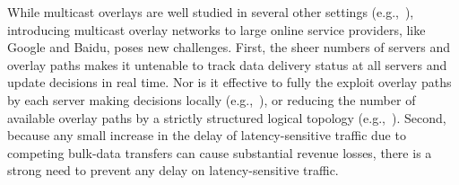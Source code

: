 While multicast overlays are well studied in several other settings
(e.g.,~\cite{Liebeherr2002Application,Wang2007mTreebone,Andreev2013Designing,Mokhtarian2015Minimum}), introducing multicast overlay networks
to large online  service providers,
like Google and Baidu, poses new challenges.
First, the sheer numbers of servers and overlay paths makes
it untenable to track data delivery status at all servers and
update decisions in real time.
Nor is it effective to fully the exploit
overlay paths by each server making decisions locally
(e.g.,~\cite{kostic2003bullet,Repantis2010Scaling}),
or reducing the number of available overlay paths by a
strictly structured logical topology
(e.g.,~\cite{Nygren2010The}).
Second, because any small increase in the delay of
latency-sensitive traffic due to competing bulk-data transfers
 can cause substantial revenue losses,
there is a strong need to prevent any delay on
latency-sensitive traffic.




